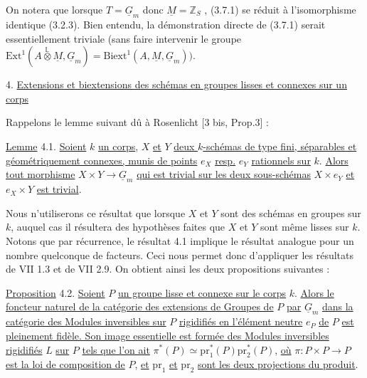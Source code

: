 On notera que lorsque $T = \underline{G}_m$ donc $\underline{M} = \mathbb{Z}_S$ , (3.7.1) se réduit à l'isomorphisme identique (3.2.3). Bien entendu, la démonstration directe de (3.7.1) serait essentiellement triviale (sans faire intervenir le groupe $\mathrm{Ext}^1(A \stackrel{\mathbb{L}}{\otimes} \underline{M},\underline{G}_m) =\mathrm{Biext}^1(A,\underline{M},\underline{G}_m))$.




4. \underline{Extensions et biextensions des schémas en groupes lisses et connexes sur un corps}

Rappelons le lemme suivant dû à Rosenlicht [3 bis, Prop.3] :

\underline{Lemme} 4.1. \underline{Soient} $k$ \underline{un corps}, $X$ \underline{et} $Y$ \underline{deux $k$-schémas de type fini, séparables et géométriquement connexes, munis de points} $e_X$ \underline{resp.} $e_Y$ \underline{rationnels sur} $k$. \underline{Alors tout morphisme} $X \times Y \longrightarrow \underline{G}_m$ \underline{qui est trivial sur les deux sous-schémas} $X \times e_Y$ \underline{et} $e_X \times Y$ \underline{est trivial}.

Nous n'utiliserons ce résultat que lorsque $X$ et $Y$ sont des schémas en groupes sur $k$, auquel cas il résultera des hypothèses faites que $X$ et $Y$ sont même lisses sur $k$. Notons que par récurrence, le résultat 4.1 implique le résultat analogue pour un nombre quelconque de facteurs. Ceci nous permet donc d'appliquer les résultats de VII 1.3 et de VII 2.9. On obtient ainsi les deux propositions suivantes :

\underline{Proposition} 4.2. \underline{Soient} $P$ \underline{un groupe lisse et connexe sur le corps} $k$. \underline{Alors le foncteur naturel de la catégorie des extensions de Groupes de} $P$ \underline{par} $\underline{G}_m$ \underline{dans la catégorie des Modules inversibles sur} $P$ \underline{rigidifiés en l'élément neutre} $e_P$ \underline{de} $P$ \underline{est pleinement fidèle. Son image essentielle est formée des Modules inversibles rigidifiés} $L$ \underline{sur} $P$ \underline{tels que l'on ait} $\pi^*(P) \simeq \mathrm{pr}_1^*(P)\mathrm{pr}_2^*(P)$, \underline{où} $\pi : P \times P \longrightarrow P$ \underline{est la loi de composition de} $P$, \underline{et} $\mathrm{pr}_1$ \underline{et} $\mathrm{pr}_2$ \underline{sont les deux projections du produit}.


